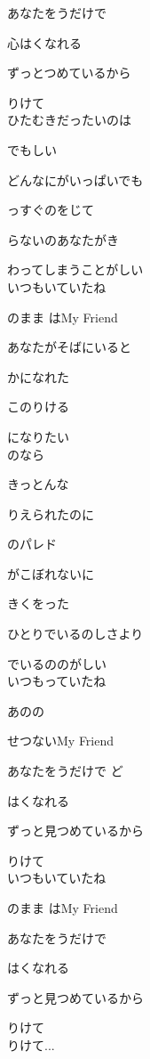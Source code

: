 \large{

あなたをうだけで 

心はくなれる 

ずっとつめているから 

りけて 
\\

ひたむきだったいのは 

でもしい 

どんなにがいっぱいでも 

っすぐのをじて 

らないのあなたがき 

わってしまうことがしい 
\\

いつもいていたね 

のまま はMy Friend 

あなたがそばにいると 

かになれた 

このりける 

になりたい 
\\

のなら 

きっとんな 

りえられたのに 

のパレド 

がこぼれないに 

きくをった 

ひとりでいるのしさより 

でいるののがしい 
\\

いつもっていたね 

あのの 

せつないMy Friend 

あなたをうだけで ど

はくなれる 

ずっと見つめているから 

りけて 
\\

いつもいていたね 

のまま はMy Friend 

あなたをうだけで 

はくなれる 

ずっと見つめているから 

りけて 
\\

りけて...

}